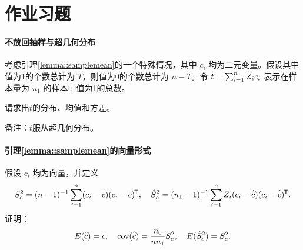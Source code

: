 \section{作业习题}

\paragraph{不放回抽样与超几何分布}
\label{problem::srs-hypergeometric}


考虑引理\ref{lemma::samplemean}的一个特殊情况，其中 $c_i$ 均为二元变量。假设其中值为1的个数总计为 $T$，则值为0的个数总计为 $n-T$。令 $t = \sum_{i=1}^n Z_i c_i$ 表示在样本量为 $n_1$ 的样本中值为1的总数。 

请求出$t$的分布、均值和方差。 

备注：$t$服从超几何分布。  



\paragraph{引理\ref{lemma::samplemean}的向量形式}
\label{para::srs-vector-form}


假设 $c_i$ 均为向量，并定义
$$
S_c^2 = (n-1)^{-1} \sum_{i=1}^n (c_i  - \bar{c})(c_i -  \bar{c}) ^{\mkern-1.5mu\mathsf{T}} ,\quad
\hat S_c^2 = (n_1-1)^{-1} \sum_{i=1}^n Z_i (c_i  - \hat{\bar{c}})(c_i - \hat{\bar{c}}) ^{\mkern-1.5mu\mathsf{T}} .
$$
证明：
$$
E(\hat{\bar{c}}) = \bar c,\quad
\textup{cov}( \hat{\bar{c}} ) = \frac{n_0}{ nn_1} S_c^2,\quad
E(\hat S_c^2 ) = S_c^2 .
$$



